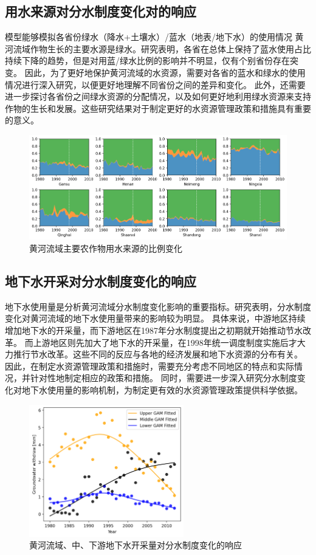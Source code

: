 \subsection{用水来源对分水制度变化对的响应}

模型能够模拟各省份绿水（降水+土壤水）/蓝水（地表/地下水）的使用情况
黄河流域作物生长的主要水源是绿水。研究表明，各省在总体上保持了蓝水使用占比持续下降的趋势，但是对用蓝/绿水比例的影响并不明显，仅有个别省份存在突变。
因此，为了更好地保护黄河流域的水资源，需要对各省的蓝水和绿水的使用情况进行深入研究，以便更好地理解不同省份之间的差异和变化。
此外，还需要进一步探讨各省份之间绿水资源的分配情况，以及如何更好地利用绿水资源来支持作物的生长和发展。这些研究结果对于制定更好的水资源管理政策和措施具有重要的意义。

\begin{figure}[htb]
    \centering
    \includegraphics[width=\textwidth]{img/ch6/ch6_green_blue_water.png}
    \caption{黄河流域主要农作物用水来源的比例变化}\label{ch6:fig:sources}
\end{figure}

\subsection{地下水开采对分水制度变化的响应}

地下水使用量是分析黄河流域分水制度变化影响的重要指标。研究表明，分水制度变化对黄河流域的地下水使用量带来的影响较为明显。
具体来说，中游地区持续增加地下水的开采量，而下游地区在1987年分水制度提出之初期就开始推动节水改革。
而上游地区则先加大了地下水的开采量，在1998年统一调度制度实施后才大力推行节水改革。这些不同的反应与各地的经济发展和地下水资源的分布有关。
因此，在制定水资源管理政策和措施时，需要充分考虑不同地区的特点和实际情况，并针对性地制定相应的政策和措施。
同时，需要进一步深入研究分水制度变化对地下水使用量的影响机制，为制定更有效的水资源管理政策提供科学依据。

\begin{figure}[htb]
    \centering
    \includegraphics[width=0.6\textwidth]{img/ch6/ch6_groundwater.png}
    \caption{黄河流域、中、下游地下水开采量对分水制度变化的响应}\label{ch6:fig:groundwater}
\end{figure}